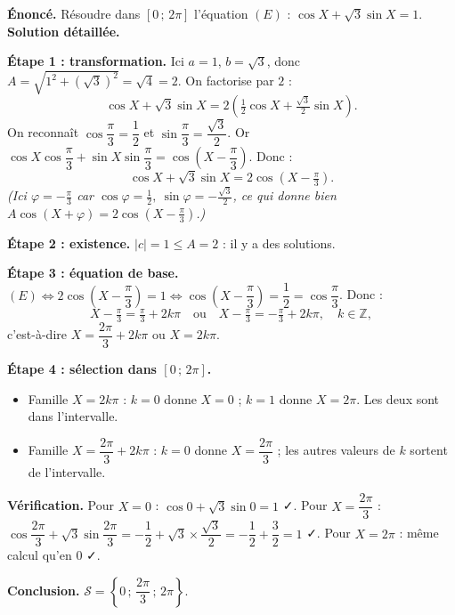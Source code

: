 \documentclass[11pt]{article}
\begin{document}
\begin{exoresolu}[{Résoudre $\cos X + \sqrt{3}\sin X = 1$ dans $[0\,;\,2\pi]$}]
\textbf{Énoncé.} Résoudre dans $[0\,;\,2\pi]$ l'équation $(E)$ : $\cos X + \sqrt{3}\sin X = 1$.
\tcblower
\textbf{Solution détaillée.}

\textbf{Étape 1 : transformation.} Ici $a = 1$, $b = \sqrt{3}$, donc $A = \sqrt{1^2 + (\sqrt{3})^2} = \sqrt{4} = 2$. On factorise par $2$ :
\[ \cos X + \sqrt{3}\sin X = 2\left(\tfrac{1}{2}\cos X + \tfrac{\sqrt{3}}{2}\sin X\right). \]
On reconnaît $\cos\dfrac{\pi}{3} = \dfrac{1}{2}$ et $\sin\dfrac{\pi}{3} = \dfrac{\sqrt{3}}{2}$. Or $\cos X\cos\dfrac{\pi}{3} + \sin X\sin\dfrac{\pi}{3} = \cos\left(X - \dfrac{\pi}{3}\right)$. Donc :
\[ \cos X + \sqrt{3}\sin X = 2\cos\left(X - \tfrac{\pi}{3}\right). \]
\emph{(Ici $\varphi = -\frac{\pi}{3}$ car $\cos\varphi=\frac{1}{2},\ \sin\varphi=-\frac{\sqrt{3}}{2}$, ce qui donne bien $A\cos(X+\varphi)=2\cos(X-\frac{\pi}{3})$.)}

\textbf{Étape 2 : existence.} $|c| = 1 \leq A = 2$ : il y a des solutions.

\textbf{Étape 3 : équation de base.} $(E) \Longleftrightarrow 2\cos\left(X - \dfrac{\pi}{3}\right) = 1 \Longleftrightarrow \cos\left(X - \dfrac{\pi}{3}\right) = \dfrac{1}{2} = \cos\dfrac{\pi}{3}$. Donc :
\[ X - \tfrac{\pi}{3} = \tfrac{\pi}{3} + 2k\pi \quad \text{ou} \quad X - \tfrac{\pi}{3} = -\tfrac{\pi}{3} + 2k\pi, \quad k \in \mathbb{Z}, \]
c'est-à-dire $X = \dfrac{2\pi}{3} + 2k\pi$ \; ou \; $X = 2k\pi$.

\textbf{Étape 4 : sélection dans $[0\,;\,2\pi]$.}
\begin{itemize}
\item Famille $X = 2k\pi$ : $k=0$ donne $X = 0$ ; $k=1$ donne $X = 2\pi$. Les deux sont dans l'intervalle.
\item Famille $X = \dfrac{2\pi}{3} + 2k\pi$ : $k=0$ donne $X = \dfrac{2\pi}{3}$ ; les autres valeurs de $k$ sortent de l'intervalle.
\end{itemize}

\textbf{Vérification.} Pour $X = 0$ : $\cos 0 + \sqrt{3}\sin 0 = 1$ ✓. Pour $X = \dfrac{2\pi}{3}$ : $\cos\dfrac{2\pi}{3} + \sqrt{3}\sin\dfrac{2\pi}{3} = -\dfrac{1}{2} + \sqrt{3}\times\dfrac{\sqrt{3}}{2} = -\dfrac{1}{2} + \dfrac{3}{2} = 1$ ✓. Pour $X = 2\pi$ : même calcul qu'en $0$ ✓.

\textbf{Conclusion.} $\mathcal{S} = \left\{0\,;\,\dfrac{2\pi}{3}\,;\,2\pi\right\}$.
\end{exoresolu}
\end{document}
